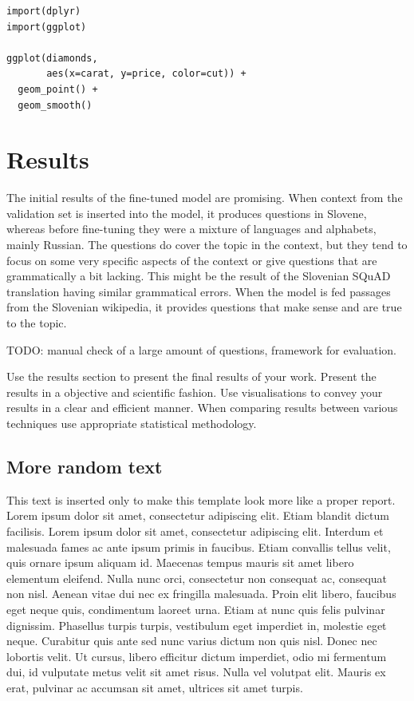 \documentclass[fleqn,moreauthors,10pt]{ds_report}
\begin{document}
\lstset{language=Python}


\lstset{language=R}
\begin{lstlisting}
import(dplyr)
import(ggplot)

ggplot(diamonds,
	   aes(x=carat, y=price, color=cut)) +
  geom_point() +
  geom_smooth()
\end{lstlisting}


\section*{Results}

The initial results of the fine-tuned model are promising. When context from the validation set is inserted into the model, it produces questions in Slovene, whereas before fine-tuning they were a mixture of languages and alphabets, mainly Russian. The questions do cover the topic in the context, but they tend to focus on some very specific aspects of the context or give questions that are grammatically a bit lacking. This might be the result of the Slovenian SQuAD translation having similar grammatical errors. When the model is fed passages from the Slovenian wikipedia, it provides questions that make sense and are true to the topic.


TODO: manual check of a large amount of questions, framework for evaluation.


Use the results section to present the final results of your work. Present the results in a objective and scientific fashion. Use visualisations to convey your results in a clear and efficient manner. When comparing results between various techniques use appropriate statistical methodology.

\subsection*{More random text}

This text is inserted only to make this template look more like a proper report. Lorem ipsum dolor sit amet, consectetur adipiscing elit. Etiam blandit dictum facilisis. Lorem ipsum dolor sit amet, consectetur adipiscing elit. Interdum et malesuada fames ac ante ipsum primis in faucibus. Etiam convallis tellus velit, quis ornare ipsum aliquam id. Maecenas tempus mauris sit amet libero elementum eleifend. Nulla nunc orci, consectetur non consequat ac, consequat non nisl. Aenean vitae dui nec ex fringilla malesuada. Proin elit libero, faucibus eget neque quis, condimentum laoreet urna. Etiam at nunc quis felis pulvinar dignissim. Phasellus turpis turpis, vestibulum eget imperdiet in, molestie eget neque. Curabitur quis ante sed nunc varius dictum non quis nisl. Donec nec lobortis velit. Ut cursus, libero efficitur dictum imperdiet, odio mi fermentum dui, id vulputate metus velit sit amet risus. Nulla vel volutpat elit. Mauris ex erat, pulvinar ac accumsan sit amet, ultrices sit amet turpis.
\end{document}
